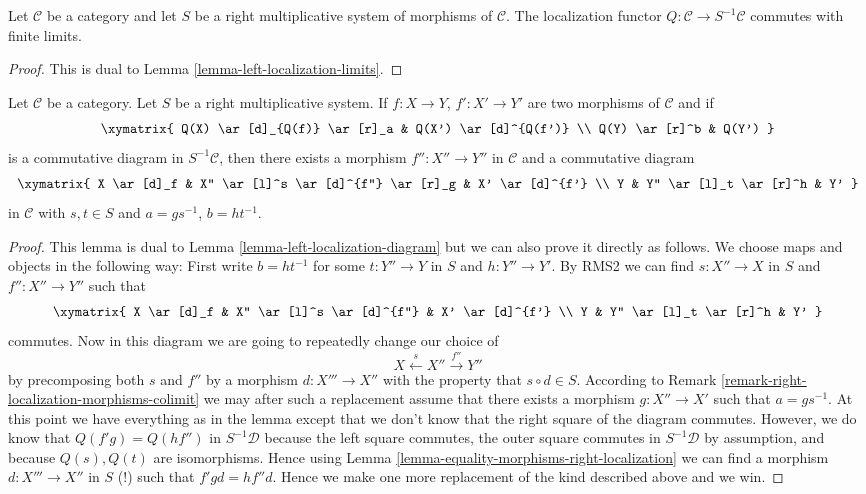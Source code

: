 \begin{lemma}
\label{lemma-right-localization-limits}
Let $\mathcal{C}$ be a category and let $S$ be a right multiplicative
system of morphisms of $\mathcal{C}$. The localization functor
$Q : \mathcal{C} \to S^{-1}\mathcal{C}$ commutes with finite limits.
\end{lemma}

\begin{proof}
This is dual to Lemma \ref{lemma-left-localization-limits}.
\end{proof}

\begin{lemma}
\label{lemma-right-localization-diagram}
Let $\mathcal{C}$ be a category. Let $S$ be a right multiplicative
system. If $f : X \to Y$, $f' : X' \to Y'$ are two morphisms of
$\mathcal{C}$ and if
$$
\xymatrix{
Q(X) \ar[d]_{Q(f)} \ar[r]_a & Q(X') \ar[d]^{Q(f')} \\
Q(Y) \ar[r]^b & Q(Y')
}
$$
is a commutative diagram in $S^{-1}\mathcal{C}$, then there exists
a morphism $f'' : X'' \to Y''$ in $\mathcal{C}$ and a commutative
diagram
$$
\xymatrix{
X \ar[d]_f & X'' \ar[l]^s \ar[d]^{f''} \ar[r]_g & X' \ar[d]^{f'} \\
Y & Y'' \ar[l]_t \ar[r]^h & Y'
}
$$
in $\mathcal{C}$ with $s, t \in S$ and $a = gs^{-1}$, $b = ht^{-1}$.
\end{lemma}

\begin{proof}
This lemma is dual to
Lemma \ref{lemma-left-localization-diagram}
but we can also prove it directly as follows.
We choose maps and objects in the following way:
First write $b = ht^{-1}$ for some $t : Y'' \to Y$ in $S$ and
$h : Y'' \to Y'$. By RMS2 we can find $s : X'' \to X$ in $S$ and
$f'' : X'' \to Y''$ such that
$$
\xymatrix{
X \ar[d]_f & X'' \ar[l]^s \ar[d]^{f''} & X' \ar[d]^{f'} \\
Y & Y'' \ar[l]_t \ar[r]^h & Y'
}
$$
commutes. Now in this diagram we are going to repeatedly change our
choice of
$$
X \xleftarrow{s} X'' \xrightarrow{f''} Y''
$$
by precomposing
both $s$ and $f''$ by a morphism $d : X''' \to X''$ with the property
that $s \circ d \in S$. According to
Remark \ref{remark-right-localization-morphisms-colimit}
we may after such a replacement assume that there exists a morphism
$g : X'' \to X'$ such that $a = gs^{-1}$. At this point we have everything
as in the lemma except that we don't know that the right square of the
diagram commutes. However, we do know that $Q(f'g) = Q(hf'')$ in
$S^{-1}\mathcal{D}$ because the left square commutes, the outer square commutes
in $S^{-1}\mathcal{D}$ by assumption, and because $Q(s), Q(t)$ are
isomorphisms. Hence using
Lemma \ref{lemma-equality-morphisms-right-localization}
we can find a morphism $d : X''' \to X''$ in $S$ (!) such that
$f'gd = hf''d$. Hence we make one more replacement of the kind described
above and we win.
\end{proof}

